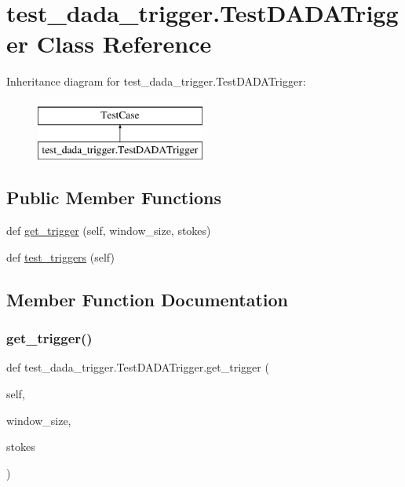 \hypertarget{classtest__dada__trigger_1_1_test_d_a_d_a_trigger}{}\section{test\+\_\+dada\+\_\+trigger.\+Test\+D\+A\+D\+A\+Trigger Class Reference}
\label{classtest__dada__trigger_1_1_test_d_a_d_a_trigger}
Inheritance diagram for test\+\_\+dada\+\_\+trigger.\+Test\+D\+A\+D\+A\+Trigger\+:\begin{figure}[H]
\begin{center}
\leavevmode
\includegraphics[height=2.000000cm]{classtest__dada__trigger_1_1_test_d_a_d_a_trigger}
\end{center}
\end{figure}
\subsection*{Public Member Functions}
\begin{DoxyCompactItemize}
\item 
def \mbox{\hyperlink{classtest__dada__trigger_1_1_test_d_a_d_a_trigger_a22ba24676cb9d3fb9954ef2234f59c43}{get\+\_\+trigger}} (self, window\+\_\+size, stokes)
\item 
def \mbox{\hyperlink{classtest__dada__trigger_1_1_test_d_a_d_a_trigger_a39479211c9da337e2983427d09d29c3f}{test\+\_\+triggers}} (self)
\end{DoxyCompactItemize}


\subsection{Member Function Documentation}
\mbox{\label{classtest__dada__trigger_1_1_test_d_a_d_a_trigger_a22ba24676cb9d3fb9954ef2234f59c43}} 
\subsubsection{\texorpdfstring{get\_trigger()}{get\_trigger()}}
{\footnotesize\ttfamily def test\+\_\+dada\+\_\+trigger.\+Test\+D\+A\+D\+A\+Trigger.\+get\+\_\+trigger (\begin{DoxyParamCaption}\item[{}]{self,  }\item[{}]{window\+\_\+size,  }\item[{}]{stokes }\end{DoxyParamCaption})}

